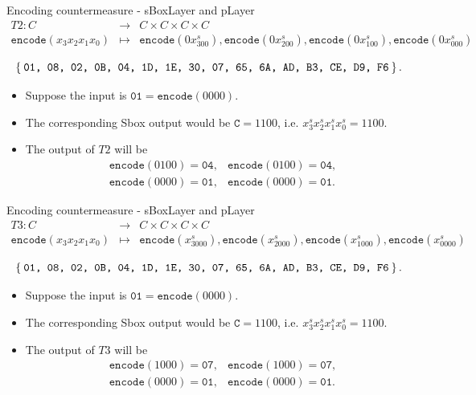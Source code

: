 \begin{frame}{Encoding countermeasure - sBoxLayer and pLayer}
\begin{eqnarray*}
T2:C &\to& C\times C\times C\times C\\
\texttt{encode}(x_3x_2x_1x_0) &\mapsto& \texttt{encode}(0x^s_300),\texttt{encode}(0x^s_200),\texttt{encode}(0x^s_100),\texttt{encode}(0x^s_000)
\end{eqnarray*}
    \begin{example}
    \begin{equation*}
    \Set{\texttt{01, 08, 02, 0B, 04, 1D, 1E, 30, 07, 65, 6A, AD, B3, CE, D9, F6}}.
\end{equation*}
\begin{itemize}
    \item Suppose the input is $\texttt{01}=\texttt{encode}(0000)$.
    \item The corresponding Sbox output would be $\texttt{C}=1100$, i.e. $x^s_3x^s_2x^s_1x^s_0=1100$.
    \item  The output of $T2$ will be 
     \begin{eqnarray*}
     &\texttt{encode}(0100)=\texttt{04}, 
     &\texttt{encode}(0100)=\texttt{04},\\ 
     &\texttt{encode}(0000)=\texttt{01},
     &\texttt{encode}(0000)=\texttt{01}.
     \end{eqnarray*}
\end{itemize}
\end{example}
\end{frame}


\begin{frame}{Encoding countermeasure - sBoxLayer and pLayer}
\begin{eqnarray*}
T3:C &\to& C\times C\times C\times C\\
\texttt{encode}(x_3x_2x_1x_0) &\mapsto& \texttt{encode}(x^s_3000),\texttt{encode}(x^s_2000),\texttt{encode}(x^s_1000),\texttt{encode}(x^s_0000)
\end{eqnarray*}
    \begin{example}
    \begin{equation*}
    \Set{\texttt{01, 08, 02, 0B, 04, 1D, 1E, 30, 07, 65, 6A, AD, B3, CE, D9, F6}}.
\end{equation*}
\begin{itemize}
    \item Suppose the input is $\texttt{01}=\texttt{encode}(0000)$.
    \item The corresponding Sbox output would be $\texttt{C}=1100$, i.e. $x^s_3x^s_2x^s_1x^s_0=1100$.
    \item  The output of $T3$ will be
     \begin{eqnarray*}
        &\texttt{encode}(1000)=\texttt{07}, 
        & \texttt{encode}(1000)=\texttt{07},\\ 
        &\texttt{encode}(0000)=\texttt{01},
        &\texttt{encode}(0000)=\texttt{01}.
     \end{eqnarray*}
\end{itemize}
\end{example}
\end{frame}

